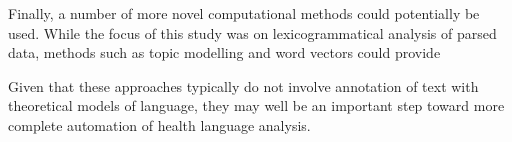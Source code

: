 \documentclass{article}
\begin{document}
Finally, a number of more novel computational methods could potentially be used. While the focus of this study was on lexicogrammatical analysis of parsed data, methods such as topic modelling and word vectors could provide 

Given that these approaches typically do not involve annotation of text with theoretical models of language, they may well be an important step toward more complete automation of health language analysis.

\printbibliography[heading=bibintoc]
\end{document}
